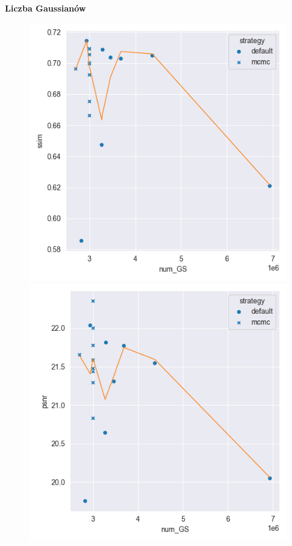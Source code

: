 \textbf{Liczba Gaussianów}

\begin{figure}[h!]
    \centering
    \begin{minipage}{0.3\textwidth}
        \centering
        \includegraphics[width=\textwidth]{img/gs_metrics/ssim_num_GS.png}
    \end{minipage}
    \hfill
    \begin{minipage}{0.3\textwidth}
        \centering
        \includegraphics[width=\textwidth]{img/gs_metrics/psnr_num_GS.png}

\end{minipage}
\end{figure}
